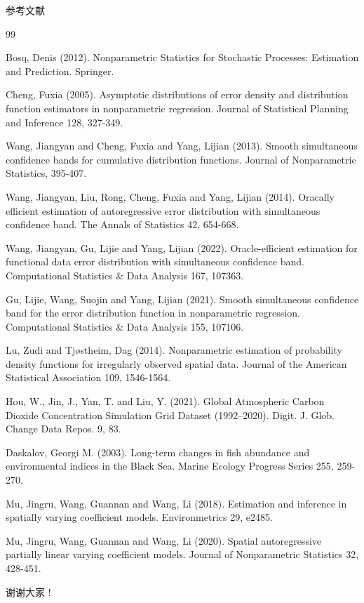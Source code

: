\documentclass{beamer}
\begin{document}
\begin{frame}{参考文献}
\tiny
\begin{thebibliography}{99}

Bosq, Denis (2012). Nonparametric Statistics for Stochastic Processes: Estimation and Prediction. Springer.

Cheng, Fuxia (2005). Asymptotic distributions of error density and distribution function estimators in nonparametric regression. Journal of Statistical Planning and Inference 128, 327-349.

Wang, Jiangyan and Cheng, Fuxia and Yang, Lijian (2013). Smooth simultaneous confidence bands for cumulative distribution functions. Journal of Nonparametric Statistics, 395-407.

Wang, Jiangyan, Liu, Rong, Cheng, Fuxia and Yang, Lijian (2014). Oracally efficient estimation of autoregressive error distribution with simultaneous confidence band. The Annals of Statistics 42, 654-668.

Wang, Jiangyan, Gu, Lijie and Yang, Lijian (2022). Oracle-efficient estimation for functional data error distribution with simultaneous confidence band. Computational Statistics \& Data Analysis 167, 107363.

Gu, Lijie, Wang, Suojin and Yang, Lijian (2021). Smooth simultaneous confidence band for the error distribution function in nonparametric regression. Computational Statistics \& Data Analysis 155, 107106.

Lu, Zudi and Tj{\o}stheim, Dag (2014). Nonparametric estimation of probability density functions for irregularly observed spatial data. Journal of the American Statistical Association 109, 1546-1564.

Hou, W., Jin, J., Yan, T. and Liu, Y. (2021). Global Atmospheric Carbon Dioxide Concentration Simulation Grid Dataset (1992--2020). Digit. J. Glob. Change Data Repos. 9, 83.

Daskalov, Georgi M. (2003). Long-term changes in fish abundance and environmental indices in the Black Sea. Marine Ecology Progress Series 255, 259-270.

Mu, Jingru, Wang, Guannan and Wang, Li (2018). Estimation and inference in spatially varying coefficient models. Environmetrics 29, e2485.

Mu, Jingru, Wang, Guannan and Wang, Li (2020). Spatial autoregressive partially linear varying coefficient models. Journal of Nonparametric Statistics 32, 428-451.

\end{thebibliography}
\end{frame}

\begin{frame}
\begin{center}
\Huge{ 谢谢大家 !}
\end{center}
\end{frame}
\end{document}

